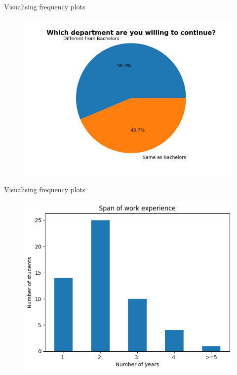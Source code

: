 \documentclass{beamer}
\begin{document}
\begin{frame}
  \begin{block}{Visualising frequency plots}
  \begin{figure}
  \centering
  \includegraphics[scale=0.4]{same or diff.jpg}
  \label{fig:3}
  \end{figure}
  \end{block}
\end{frame}

\begin{frame}
  \begin{block}{Visualising frequency plots}
  \begin{figure}
  \centering
  \includegraphics[scale=0.6]{work.png}
  \label{fig:4}
  \end{figure}
  \end{block}
\end{frame}
\end{document}
